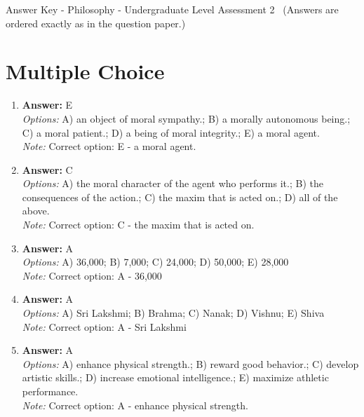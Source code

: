 \documentclass[12pt]{article}
\begin{document}
\begin{center}
Answer Key - Philosophy - Undergraduate Level Assessment 2 \
\small (Answers are ordered exactly as in the question paper.)
\end{center}

\section*{Multiple Choice}
\begin{enumerate}[label=\arabic*.]
\item \textbf{Answer:} E
\\ \textit{Options:} A) an object of moral sympathy.; B) a morally autonomous being.; C) a moral patient.; D) a being of moral integrity.; E) a moral agent.
\\ \textit{Note:} Correct option: E - a moral agent.
\item \textbf{Answer:} C
\\ \textit{Options:} A) the moral character of the agent who performs it.; B) the consequences of the action.; C) the maxim that is acted on.; D) all of the above.
\\ \textit{Note:} Correct option: C - the maxim that is acted on.
\item \textbf{Answer:} A
\\ \textit{Options:} A) 36,000; B) 7,000; C) 24,000; D) 50,000; E) 28,000
\\ \textit{Note:} Correct option: A - 36,000
\item \textbf{Answer:} A
\\ \textit{Options:} A) Sri Lakshmi; B) Brahma; C) Nanak; D) Vishnu; E) Shiva
\\ \textit{Note:} Correct option: A - Sri Lakshmi
\item \textbf{Answer:} A
\\ \textit{Options:} A) enhance physical strength.; B) reward good behavior.; C) develop artistic skills.; D) increase emotional intelligence.; E) maximize athletic performance.
\\ \textit{Note:} Correct option: A - enhance physical strength.
\end{enumerate}
\end{document}
